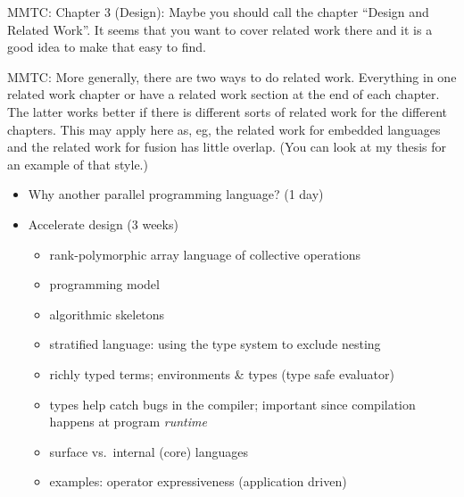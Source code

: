 MMTC: Chapter 3 (Design): Maybe you should call the chapter ``Design and Related
Work''. It seems that you want to cover related work there and it is a good idea
to make that easy to find.

MMTC: More generally, there are two ways to do related work. Everything in one
related work chapter or have a related work section at the end of each chapter.
The latter works better if there is different sorts of related work for the
different chapters. This may apply here as, eg, the related work for embedded
languages and the related work for fusion has little overlap. (You can look at
my thesis for an example of that style.)


\begin{itemize}
\item Why another parallel programming language? (1 day)

\item Accelerate design (3 weeks)
    \begin{itemize}
        \item rank-polymorphic array language of collective operations
        \item programming model
        \item algorithmic skeletons
        \item stratified language: using the type system to exclude nesting
        \item richly typed terms; environments \& types (type safe evaluator)
        \item types help catch bugs in the compiler; important since
            compilation happens at program \emph{runtime}
        \item surface vs.\ internal (core) languages
        \item examples: operator expressiveness (application driven)
    \end{itemize}

\end{itemize}


